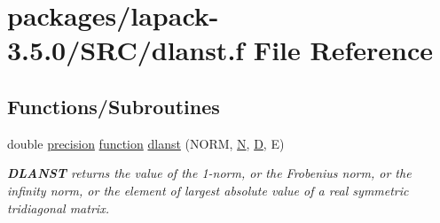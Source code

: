 \hypertarget{dlanst_8f}{}\section{packages/lapack-\/3.5.0/\+S\+R\+C/dlanst.f File Reference}
\label{dlanst_8f}
\subsection*{Functions/\+Subroutines}
\begin{DoxyCompactItemize}
\item 
double \hyperlink{numinquire_8h_a2c8e616467665d0b2814d4c1589ba74e}{precision} \hyperlink{afunc_8m_a7b5e596df91eadea6c537c0825e894a7}{function} \hyperlink{group__auxOTHERauxiliary_ga2d199841a9ffcf46d31e13e326d195dc}{dlanst} (N\+O\+R\+M, \hyperlink{polmisc_8c_a0240ac851181b84ac374872dc5434ee4}{N}, \hyperlink{odrpack_8h_a7dae6ea403d00f3687f24a874e67d139}{D}, E)
\begin{DoxyCompactList}\small\item\em {\bfseries D\+L\+A\+N\+S\+T} returns the value of the 1-\/norm, or the Frobenius norm, or the infinity norm, or the element of largest absolute value of a real symmetric tridiagonal matrix. \end{DoxyCompactList}\end{DoxyCompactItemize}
